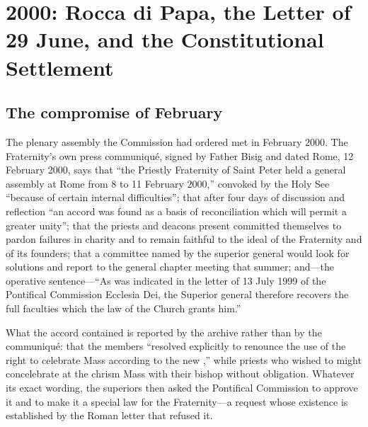 \section{2000: Rocca di Papa, the Letter of 29 June, and the Constitutional Settlement}

\subsection{The compromise of February}

The plenary assembly the Commission had ordered met in February 2000. The
Fraternity's own press communiqué, signed by Father Bisig and dated Rome,
12 February 2000, says that ``the Priestly Fraternity of Saint Peter held
a general assembly at Rome from 8 to 11 February 2000,'' convoked by the
Holy See ``because of certain internal difficulties''; that after four
days of discussion and reflection ``an accord was found as a basis of
reconciliation which will permit a greater unity''; that the priests and
deacons present committed themselves to pardon failures in charity and to
remain faithful to the ideal of the Fraternity and of its founders; that
a committee named by the superior general would look for solutions and
report to the general chapter meeting that summer; and---the operative
sentence---``As was indicated in the letter of 13 July 1999 of the
Pontifical Commission Ecclesia Dei, the Superior general therefore
recovers the full faculties which the law of the Church grants
him.''

What the accord contained is reported by the archive rather than by the
communiqué: that the members ``resolved explicitly to renounce the use of
the right to celebrate Mass according to the new ,''
while priests who wished to might concelebrate at the chrism Mass with
their bishop without obligation. Whatever its exact wording, the
superiors then asked the Pontifical Commission to approve it and to make
it a special law for the Fraternity---a request whose existence is
established by the Roman letter that refused it.

